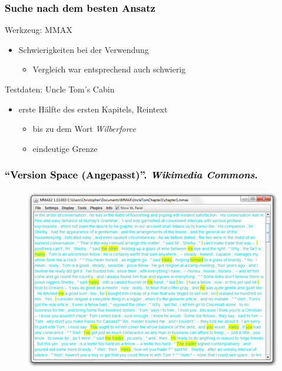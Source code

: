 \documentclass[xcolor=dvipsnames]{beamer}
\begin{document}
\begin{frame}\frametitle{\textcolor{black}{Suche nach dem besten Ansatz}}

\begin{block}{Werkzeug: MMAX}
\begin{itemize}
\item Schwierigkeiten bei der Verwendung
\begin{itemize}
\item Vergleich war entsprechend auch schwierig
\end{itemize}
\end{itemize}
\end{block}

\begin{block}{Testdaten: Uncle Tom's Cabin}
\begin{itemize}
\item erste Hälfte des ersten Kapitels, Reintext
\begin{itemize}
\item bis zu dem Wort \emph{Wilberforce}
\item eindeutige Grenze
\end{itemize}
\end{itemize}
\end{block}

\end{frame}


\begin{frame}\frametitle{\textcolor{black}{``{Version Space (Angepasst)}''. \emph{Wikimedia Commons}.}}
\begin{figure}
\includegraphics{cm_mmax.png}
\end{figure}

\end{frame}
\end{document}

